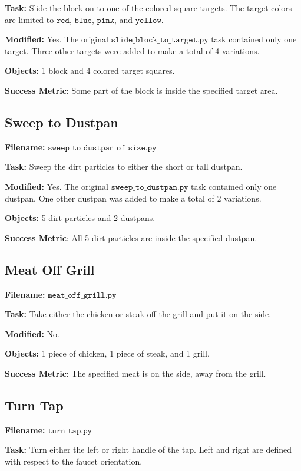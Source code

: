 \documentclass{article}
\begin{document}
\textbf{Task:} Slide the block on to one of the colored square targets. The target colors are limited to $\texttt{red}$, $\texttt{blue}$, $\texttt{pink}$, and $\texttt{yellow}$.

\textbf{Modified:} Yes. The original $\texttt{slide\_block\_to\_target.py}$ task contained only one target. Three other targets were added to make a total of 4 variations.

\textbf{Objects:} 1 block and 4 colored target squares.

\textbf{Success Metric}: Some part of the block is inside the specified target area.

\subsection{Sweep to Dustpan}
\textbf{Filename:} $\texttt{sweep\_to\_dustpan\_of\_size.py}$ 

\textbf{Task:} Sweep the dirt particles to either the short or tall dustpan.

\textbf{Modified:} Yes. The original $\texttt{sweep\_to\_dustpan.py}$ task contained only one dustpan. One other dustpan was added to make a total of 2 variations. 

\textbf{Objects:} 5 dirt particles and 2 dustpans.

\textbf{Success Metric}: All 5 dirt particles are inside the specified dustpan. 

\subsection{Meat Off Grill}
\textbf{Filename:} $\texttt{meat\_off\_grill.py}$ 

\textbf{Task:} Take either the chicken or steak off the grill and put it on the side. 

\textbf{Modified:} No.

\textbf{Objects:} 1 piece of chicken, 1 piece of steak, and 1 grill.

\textbf{Success Metric}: The specified meat is on the side, away from the grill. 

\subsection{Turn Tap}
\textbf{Filename:} $\texttt{turn\_tap.py}$ 

\textbf{Task:} Turn either the left or right handle of the tap. Left and right are defined with respect to the faucet orientation.  
\end{document}
